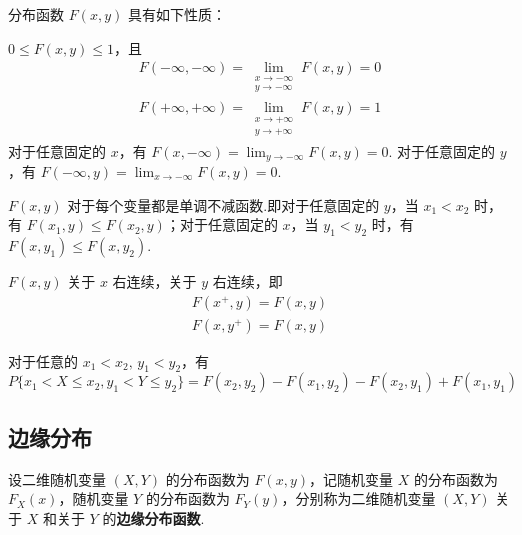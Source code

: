 分布函数 $F(x,y)$ 具有如下性质：

\setcounter{propertyname}{0}

\begin{property}
    $0 \leqslant F(x,y) \leqslant 1$，且
    \begin{gather*}
        F(-\infty, -\infty) = \lim_{\substack{x \to -\infty \\ y \to -\infty}} F(x,y) = 0 \\
        F(+\infty, +\infty) = \lim_{\substack{x \to +\infty \\ y \to +\infty}} F(x,y) = 1
    \end{gather*}
    对于任意固定的 $x$，有 $F(x,-\infty) = \displaystyle\lim_{y \to -\infty} F(x,y) = 0$.\newline
    对于任意固定的 $y$，有 $F(-\infty,y) = \displaystyle\lim_{x \to -\infty} F(x,y) = 0$.
\end{property}

\begin{property}
    $F(x,y)$ 对于每个变量都是单调不减函数.即对于任意固定的 $y$，当 $x_1 < x_2$ 时，有 $F(x_1, y) \leqslant F(x_2, y)$；对于任意固定的 $x$，当 $y_1 < y_2$ 时，有 $F(x, y_1) \leqslant F(x, y_2)$.
\end{property}

\begin{property}
    $F(x,y)$ 关于 $x$ 右连续，关于 $y$ 右连续，即
    \begin{gather*}
        F(x^+, y) = F(x, y) \\
        F(x, y^+) = F(x, y)
    \end{gather*}
\end{property}

\begin{property}
    对于任意的 $x_1 < x_2, \, y_1 < y_2$，有
    $$
    P\{x_1 < X \leqslant x_2, y_1 < Y \leqslant y_2\} = F(x_2, y_2) - F(x_1, y_2) - F(x_2, y_1) + F(x_1, y_1)
    $$
\end{property}

\subsection{边缘分布}

\begin{definition}
    设二维随机变量 $(X,Y)$ 的分布函数为 $F(x,y)$，记随机变量 $X$ 的分布函数为 $F_{X}(x)$，随机变量 $Y$ 的分布函数为 $F_{Y}(y)$，分别称为二维随机变量 $(X,Y)$ 关于 $X$ 和关于 $Y$ 的\textbf{边缘分布函数}.
\end{definition}

